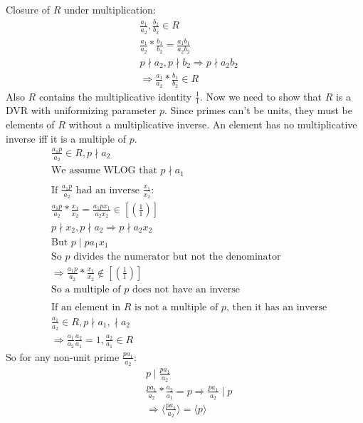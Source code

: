\documentclass[11pt]{article}
\begin{document}
{Closure of $R$ under multiplication:
\begin{align*}
&\frac{a_1}{a_2}, \frac{b_1}{b_2} \in R\\
&\frac{a_1}{a_2}* \frac{b_1}{b_2} = \frac{a_1b_1}{a_2b_2}\\
&p \nmid a_2, p \nmid b_2 \Rightarrow p \nmid a_2b_2\\
&\Rightarrow \frac{a_1}{a_2}* \frac{b_1}{b_2} \in R
\end{align*}
Also $R$ contains the multiplicative identity $\frac{1}{1}$.
\newline
Now we need to show that $R$ is a DVR with uniformizing parameter $p$.
\newline
Since primes can't be units, they must be elements of $R$ without a multiplicative inverse. An element has no multiplicative inverse iff it is a multiple of $p$.
\begin{align*}
&\frac{a_1p}{a_2} \in R, p \nmid a_2\\
&\text{We assume WLOG that $p \nmid a_1$}\\
&\\
&\text{If $\frac{a_1p}{a_2}$ had an inverse $\frac{x_1}{x_2}$:}\\
&\frac{a_1p}{a_2}*\frac{x_1}{x_2} = \frac{a_1px_1}{a_2x_2} \in \left[ \left( \frac{1}{1} \right) \right]\\
& p \nmid x_2, p \nmid a_2 \Rightarrow p \nmid a_2x_2\\
&\text{But } p \mid pa_1x_1 \\
&\text{So $p$ divides the numerator but not the denominator}\\
&\Rightarrow \frac{a_1p}{a_2}*\frac{x_1}{x_2} \notin \left[ \left( \frac{1}{1} \right) \right]\\
&\text{So a multiple of $p$ does not have an inverse}\\
&\\
&\text{If an element in $R$ is not a multiple of $p$, then it has an inverse}\\
&\frac{a_1}{a_2} \in R, p \nmid a_1, \nmid a_2\\
&\Rightarrow \frac{a_1}{a_2}\frac{a_2}{a_1} = 1, \frac{a_2}{a_1} \in R
\end{align*}
So for any non-unit prime $\frac{pa_1}{a_2}$:
\begin{align*}
&p \mid \frac{pa_1}{a_2}\\
&\frac{pa_1}{a_2} * \frac{a_2}{a_1} = p \Rightarrow \frac{pa_1}{a_2} \mid p\\
&\Rightarrow \langle \frac{pa_1}{a_2} \rangle = \langle p \rangle
\end{align*}
}
\end{document}
